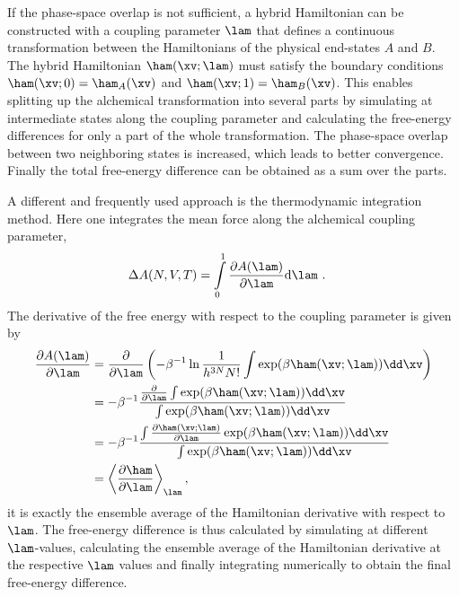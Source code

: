 If the phase-space overlap is not 
sufficient, 
a hybrid Hamiltonian can be constructed with a coupling parameter $\lam$ that defines a continuous transformation between the Hamiltonians of the physical end-states $A$ and $B$. The hybrid Hamiltonian $\ham(\xv;\lam)$ must satisfy the boundary conditions 
$\ham(\xv;0)=\ham_A(\xv)$ and $\ham(\xv;1)=\ham_B(\xv)$. This enables splitting up the alchemical transformation into 
several parts by simulating at intermediate states along the coupling parameter and calculating the free-energy differences for only a part of the whole transformation. The 
phase-space overlap between two neighboring states is increased, which leads to better convergence. 
Finally the total free-energy difference can be obtained as a sum over the parts.

A different and frequently used approach is the thermodynamic integration method\cite{KI33.1,KI34.2,KI35.1}. Here one integrates 
the
mean
force along the alchemical coupling parameter,
%
\begin{align}
    \Delta A(N,V,T)&= \int\limits_0^1 \frac{\partial A(\lam)}{\partial \lam}\mathrm{d} \lam\ . \label{eq:ti}
\end{align}
%
The derivative of the free energy with respect to the coupling parameter is given by 
%
\begin{align}
    \frac{\partial A(\lam)}{\partial \lam} &= \frac{\partial}{\partial \lam} \left ( -\beta^{-1} \ln \frac{1}{h^{3N}N!} \int \exp (\beta \ham (\xv; \lam)) \dd \xv \right ) \nonumber\\
&= -\beta^{-1} \frac {\frac{\partial}{\partial \lam}  \int \exp (\beta \ham (\xv; \lam)) \dd \xv }{ \int \exp (\beta \ham (\xv; \lam)) \dd \xv} \nonumber \\
&= -\beta^{-1} \frac {  \int \frac{\partial \ham(\xv; \lam)}{\partial \lam} \exp (\beta \ham (\xv; \lam)) \dd \xv }{ \int \exp (\beta \ham (\xv; \lam)) \dd \xv} \nonumber\\
&= \left \langle \frac{\partial \ham}{\partial \lam} \right \rangle _{\lam}, \label{eq:der}
\end{align}
%
\ie{} it is exactly the ensemble average of the Hamiltonian derivative with respect to $\lam$.
%
The free-energy difference is thus calculated by simulating at different $\lam$-values,
calculating the ensemble average of the Hamiltonian derivative at the respective $\lam$ values 
and finally integrating numerically to obtain the final free-energy difference.


